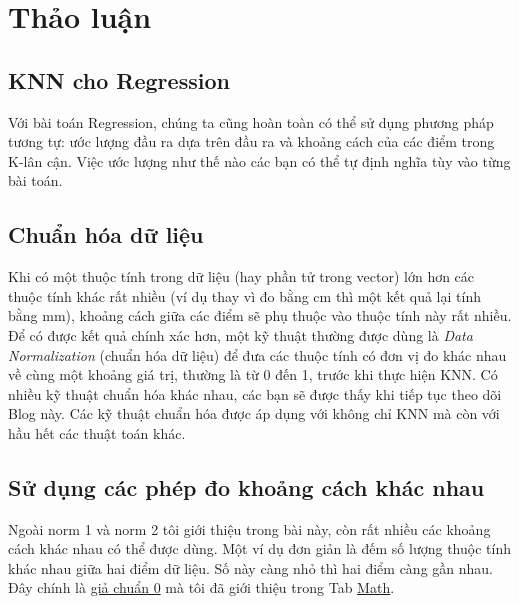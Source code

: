  
 
\section{Thảo luận}
 
 
 
\subsection{KNN cho Regression}
Với bài toán Regression, chúng ta cũng hoàn toàn có thể sử dụng phương pháp tương tự: ước lượng đầu ra dựa trên đầu ra và khoảng cách của các điểm trong K-lân cận. Việc ước lượng như thế nào các bạn có thể tự định nghĩa tùy vào từng bài toán.  
 
 
 
 
\subsection{Chuẩn hóa dữ liệu}
Khi có một thuộc tính trong dữ liệu (hay phần tử trong vector) lớn hơn các thuộc tính khác rất nhiều (ví dụ thay vì đo bằng cm thì một kết quả lại tính bằng mm), khoảng cách giữa các điểm sẽ phụ thuộc vào thuộc tính này rất nhiều. Để có được kết quả chính xác hơn, một kỹ thuật thường được dùng là \textit{Data Normalization} (chuẩn hóa dữ liệu) để đưa các thuộc tính có đơn vị đo khác nhau về cùng một khoảng giá trị, thường là từ 0 đến 1, trước khi thực hiện KNN. Có nhiều kỹ thuật chuẩn hóa khác nhau, các bạn sẽ được thấy khi tiếp tục theo dõi Blog này. Các kỹ thuật chuẩn hóa được áp dụng với không chỉ KNN mà còn với hầu hết các thuật toán khác.  
 
 
 
\subsection{Sử dụng các phép đo khoảng cách khác nhau}
Ngoài norm 1 và norm 2 tôi giới thiệu trong bài này, còn rất nhiều các khoảng cách khác nhau có thể được dùng. Một ví dụ đơn giản là đếm số lượng thuộc tính khác nhau giữa hai điểm dữ liệu. Số này càng nhỏ thì hai điểm càng gần nhau. Đây chính là \href{http://machinelearningcoban.com/math/#norm0}{giả chuẩn 0} mà tôi đã giới thiệu trong Tab \href{http://machinelearningcoban.com/math/}{Math}.  
 
